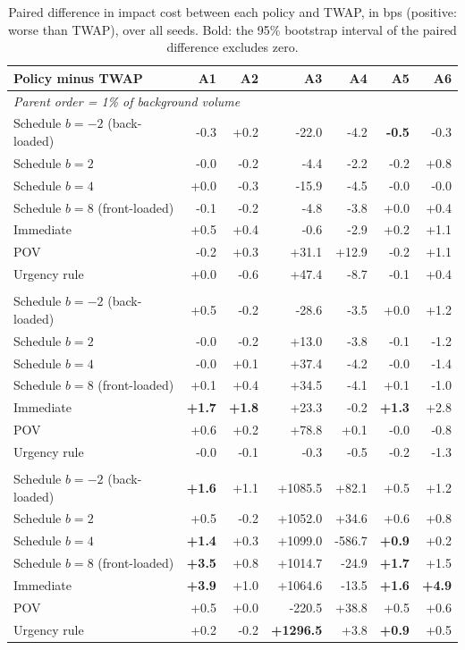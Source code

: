 \begin{table}[!htbp]
\centering\footnotesize
\caption{Paired difference in impact cost between each policy and TWAP, in bps (positive: worse than TWAP), over all seeds. Bold: the 95\% bootstrap interval of the paired difference excludes zero.}\label{tab:vstwap}
\begin{tabular}{lrrrrrr}
\toprule
Policy minus TWAP & A1 & A2 & A3 & A4 & A5 & A6 \\
\midrule
\multicolumn{7}{l}{\emph{Parent order = 1\% of background volume}} \\
Schedule $b=-2$ (back-loaded) & -0.3 & +0.2 & -22.0 & -4.2 & \textbf{-0.5} & -0.3 \\
Schedule $b=2$ & -0.0 & -0.2 & -4.4 & -2.2 & -0.2 & +0.8 \\
Schedule $b=4$ & +0.0 & -0.3 & -15.9 & -4.5 & -0.0 & -0.0 \\
Schedule $b=8$ (front-loaded) & -0.1 & -0.2 & -4.8 & -3.8 & +0.0 & +0.4 \\
Immediate & +0.5 & +0.4 & -0.6 & -2.9 & +0.2 & +1.1 \\
POV & -0.2 & +0.3 & +31.1 & +12.9 & -0.2 & +1.1 \\
Urgency rule & +0.0 & -0.6 & +47.4 & -8.7 & -0.1 & +0.4 \\
\addlinespace
\multicolumn{7}{l}{\emph{Parent order = 5\% of background volume}} \\
Schedule $b=-2$ (back-loaded) & +0.5 & -0.2 & -28.6 & -3.5 & +0.0 & +1.2 \\
Schedule $b=2$ & -0.0 & -0.2 & +13.0 & -3.8 & -0.1 & -1.2 \\
Schedule $b=4$ & -0.0 & +0.1 & +37.4 & -4.2 & -0.0 & -1.4 \\
Schedule $b=8$ (front-loaded) & +0.1 & +0.4 & +34.5 & -4.1 & +0.1 & -1.0 \\
Immediate & \textbf{+1.7} & \textbf{+1.8} & +23.3 & -0.2 & \textbf{+1.3} & +2.8 \\
POV & +0.6 & +0.2 & +78.8 & +0.1 & -0.0 & -0.8 \\
Urgency rule & -0.0 & -0.1 & -0.3 & -0.5 & -0.2 & -1.3 \\
\addlinespace
\multicolumn{7}{l}{\emph{Parent order = 20\% of background volume}} \\
Schedule $b=-2$ (back-loaded) & \textbf{+1.6} & +1.1 & +1085.5 & +82.1 & +0.5 & +1.2 \\
Schedule $b=2$ & +0.5 & -0.2 & +1052.0 & +34.6 & +0.6 & +0.8 \\
Schedule $b=4$ & \textbf{+1.4} & +0.3 & +1099.0 & -586.7 & \textbf{+0.9} & +0.2 \\
Schedule $b=8$ (front-loaded) & \textbf{+3.5} & +0.8 & +1014.7 & -24.9 & \textbf{+1.7} & +1.5 \\
Immediate & \textbf{+3.9} & +1.0 & +1064.6 & -13.5 & \textbf{+1.6} & \textbf{+4.9} \\
POV & +0.5 & +0.0 & -220.5 & +38.8 & +0.5 & +0.6 \\
Urgency rule & +0.2 & -0.2 & \textbf{+1296.5} & +3.8 & \textbf{+0.9} & +0.5 \\
\bottomrule
\end{tabular}
\end{table}
